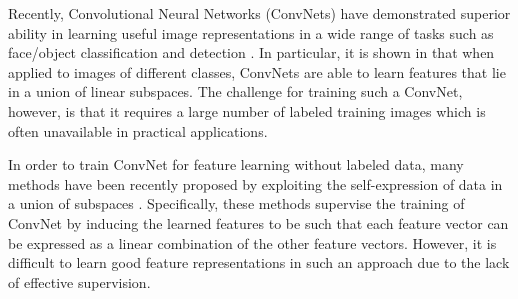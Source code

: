 \documentclass[10pt,twocolumn,letterpaper]{article}
\begin{document}
Recently, Convolutional Neural Networks (ConvNets) have demonstrated superior ability in learning useful image representations in a wide range of tasks such as face/object classification and detection \cite{Krizhevsky:NIPS2012,Parkhi:BMVC15}.
In particular, it is shown in \cite{Lezama:CVPR18} that when applied to images of different classes, ConvNets are able to learn features that lie in a union of linear subspaces.
The challenge for training such a ConvNet, however, is that it requires a large number of labeled training images which is often unavailable in practical applications.
	
In order to train ConvNet for feature learning without labeled data, many methods have been recently proposed by exploiting the self-expression of data in a union of subspaces \cite{Peng:IJCAI16, Ji:NIPS17, Peng:arxiv17,Zhou:CVPR18}.
Specifically, these methods supervise the training of ConvNet by inducing the learned features to be such that each feature vector can be expressed as a linear combination of the other feature vectors.
However, it is difficult to learn good feature representations in such an approach due to the lack of effective supervision.
\end{document}
